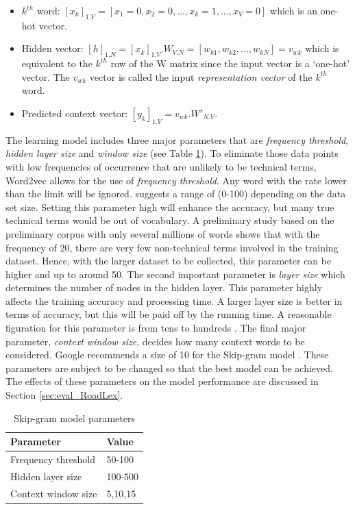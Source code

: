 \documentclass[Journal, BackFigs, DoubleSpace]{ascelike}%
\begin{document}
%
\begin{itemize}
	\item $k^{th}$ word: $[x_k]_{1.V} = [x_1=0, x_2=0,...,x_k=1,..., x_V=0]$ which is an one-hot vector.
	\item Hidden vector: $[h]_{1.N} = [x_k]_{1.V}.W_{V.N} = [w_{k1},w_{k2},..., w_{kN}]= v_{wk}$ which is equivalent to the $k^{th}$ row of the W matrix since the input vector is a `one-hot' vector. The $v_{wk}$ vector is called the input \textit{representation vector} of the $k^{th}$ word.
	\item Predicted context vector: $[y_k]_{1.V} = v_{wk}.W'_{N.V}$. 
\end{itemize}
%
\par
The learning model includes three major parameters that are \textit{frequency threshold}, \textit{hidden layer size} and \textit{window size} (see Table \ref{table:nn-parameters}). To eliminate those data points with low frequencies of occurrence that are unlikely to be technical terms, Word2vec allows for the use of \textit{frequency threshold}. Any word with the rate lower than the limit will be ignored.  suggests a range of (0-100) depending on the data set size. Setting this parameter high will enhance the accuracy, but many true technical terms would be out of vocabulary. A preliminary study based on the preliminary corpus with only several millions of words shows that with the frequency of 20, there are very few non-technical terms involved in the training dataset. Hence, with the larger dataset to be collected, this parameter can be higher and up to around 50. The second important parameter is \textit{layer size} which determines the number of nodes in the hidden layer. This parameter highly affects the training accuracy and processing time. A larger layer size is better in terms of accuracy, but this will be paid off by the running time. A reasonable figuration for this parameter is from tens to hundreds \cite{rehurek14}. The final major parameter, \textit{context window size}, decides how many context words to be considered. Google recommends a size of 10 for the Skip-gram model \cite{google2016}. These parameters are subject to be changed so that the best model can be achieved. The effects of these parameters on the model performance are discussed in Section \ref{sec:eval_RoadLex}.
%
\begin{table} [t]
	\caption{Skip-gram model parameters}
	\label{table:nn-parameters}
	\centering
	\small
	\renewcommand{\arraystretch}{1.25}
	\begin{tabular}{l l}
		\hline
		\textbf{Parameter} & \textbf{Value}\\
		\hline
		Frequency threshold & 50-100\\
		Hidden layer size		&	100-500\\
		Context window size	&	5,10,15\\
		\hline
	\end{tabular}
	\normalsize
\end{table}
\end{document}
